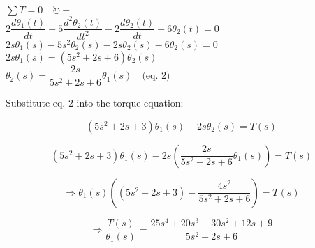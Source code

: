 \documentclass[11pt,letterpaper]{article}
\begin{document}
\begin{center}
\begin{minipage}{.5\textwidth}
\vspace{4pt}
$\sum T = 0 \quad \circlearrowright +$\\

$2\dfrac{d\theta_1(t)}{dt} - 5\dfrac{d^2\theta_2(t)}{dt^2} - 2\dfrac{d\theta_2(t)}{dt} - 6\theta_2(t) = 0$\\

$2s\theta_1(s) - 5s^2\theta_2(s) - 2s\theta_2(s) - 6\theta_2(s) = 0$\\

$2s\theta_1(s) = (5s^2 + 2s + 6)\theta_2(s)$\\

$\theta_2(s) = \dfrac{2s}{5s^2 + 2s + 6}\theta_1(s) \quad \text{(eq. 2)}$\\
\end{minipage}

\vspace{1em}

Substitute eq. 2 into the torque equation:

\[
(5s^2 + 2s + 3)\theta_1(s) - 2s\theta_2(s) = T(s)
\]

\[
(5s^2 + 2s + 3)\theta_1(s) - 2s\left(\dfrac{2s}{5s^2 + 2s + 6}\theta_1(s)\right) = T(s)
\]

\[
\Rightarrow \theta_1(s) \left( (5s^2 + 2s + 3) - \dfrac{4s^2}{5s^2 + 2s + 6} \right) = T(s)
\]

\[
\Rightarrow \dfrac{T(s)}{\theta_1(s)} = \dfrac{25s^4 + 20s^3 + 30s^2 + 12s + 9}{5s^2 + 2s + 6}
\]

\begin{center}
\end{center}

\end{center}
\end{document}
